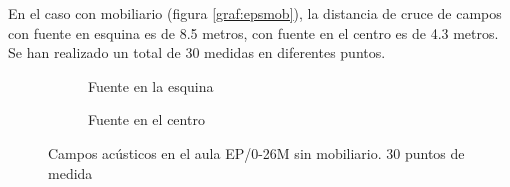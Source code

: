 En el caso con mobiliario (figura \ref{graf:epsmob}), la distancia de cruce de campos con fuente en esquina es de 8.5 metros, con fuente en el centro es de 4.3 metros. Se han realizado un total de 30 medidas en diferentes puntos.

\begin{figure}[ht]
    \begin{subfigure}[b]{0.4\textwidth}
    	\centering%
         {%
    }
    \caption{Fuente en la esquina}%
    \end{subfigure}%
    \hspace{1.9cm}%
    \begin{subfigure}[b]{0.4\textwidth}%
    	\centering%
        {%
    }
    \caption{Fuente en el centro}%
    \end{subfigure}
    \caption{Campos acústicos en el aula EP/0-26M sin mobiliario. 30 puntos de medida}
    \label{graf:epsnomob}%
\end{figure}
\FloatBarrier 

